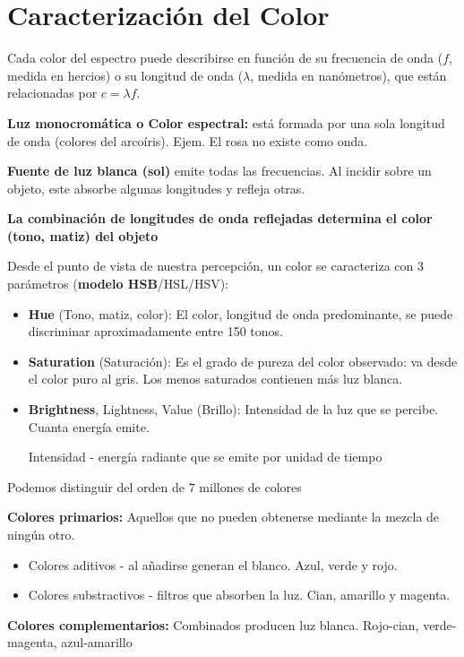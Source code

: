 \section{Caracterización del Color}
Cada color del espectro puede describirse en función de su frecuencia de onda ($f$, medida en hercios) o su longitud de onda ($\lambda$, medida en nanómetros), que están relacionadas por $c = \lambda f$.

\textbf{Luz monocromática o Color espectral:} está formada por una sola longitud de onda (colores del arcoíris). Ejem. El rosa no existe como onda.

\textbf{Fuente de luz blanca (sol)} emite todas las frecuencias. Al incidir sobre un objeto, este absorbe algunas longitudes y refleja otras.

\textbf{La combinación de longitudes de onda reflejadas determina el color (tono, matiz) del objeto}

Desde el punto de vista de nuestra percepción, un color se caracteriza con 3 parámetros (\textbf{modelo HSB}/HSL/HSV):
\begin{itemize}
	\item \textbf{Hue} (Tono, matiz, color): El color, longitud de onda predominante, se puede discriminar aproximadamente entre 150 tonos.
	\item \textbf{Saturation} (Saturación): Es el grado de pureza del color observado: va desde el color puro al gris. Los menos saturados contienen más luz blanca.
	\item \textbf{Brightness}, Lightness, Value (Brillo): Intensidad de la luz que se percibe. Cuanta energía emite.

	      Intensidad - energía radiante que se emite por unidad de tiempo
\end{itemize}

Podemos distinguir del orden de 7 millones de colores

\textbf{Colores primarios:} Aquellos que no pueden obtenerse mediante la mezcla de ningún otro.
\begin{itemize}
	\item Colores aditivos - al añadirse generan el blanco. Azul, verde y rojo.
	\item Colores substractivos - filtros que absorben la luz. Cian, amarillo y magenta.
\end{itemize}

\textbf{Colores complementarios:} Combinados producen luz blanca. Rojo-cian, verde-magenta, azul-amarillo

